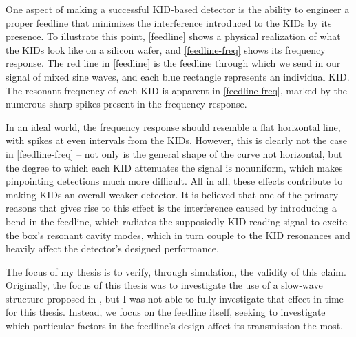One aspect of making a successful KID-based detector is the ability to engineer a proper feedline that
minimizes the interference introduced to the KIDs by its presence. To illustrate this point, \cref{feedline}
shows a physical realization of what the KIDs look like on a silicon wafer, and \cref{feedline-freq} shows
its frequency response. The red line in \cref{feedline} is the feedline through which we send in our signal
of mixed sine waves, and each blue rectangle represents an individual KID. The resonant frequency of each KID
is apparent in \cref{feedline-freq}, marked by the numerous sharp spikes present in the frequency response.

In an ideal world, the frequency response should resemble a flat horizontal line, with spikes at even
intervals from the KIDs. However, this is clearly not the case in \cref{feedline-freq} -- not only is the
general shape of the curve not horizontal, but the degree to which each KID attenuates the signal is
nonuniform, which makes pinpointing detections much more difficult. All in all, these effects contribute to
making KIDs an overall weaker detector. It is believed that one of the primary reasons that gives rise to
this effect is the interference caused by introducing a bend in the feedline, which radiates the supposiedly
KID-reading signal to excite the box's resonant cavity modes, which in turn couple to the KID resonances and
heavily affect the detector's designed performance. 

The focus of my thesis is to verify, through simulation, the validity of this claim. Originally, the focus of
this thesis was to investigate the use of a slow-wave structure proposed in
\cite{hosaengkimWireBondFreeTechnique2009}, but I was not able to fully investigate that effect in time for
this thesis. Instead, we focus on the feedline itself, seeking to investigate which particular factors in the
feedline's design affect its transmission the most.    


 


 
  
     


